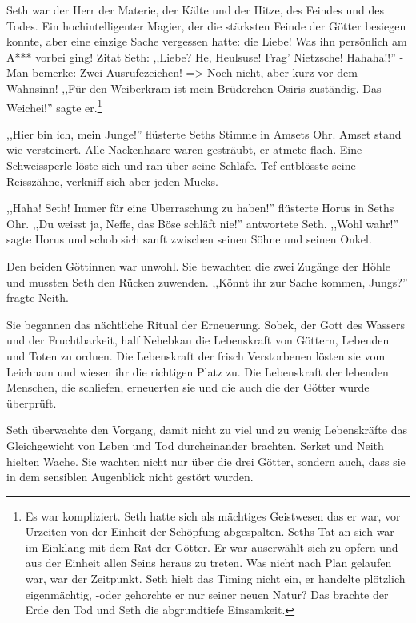 \documentclass[11pt,titlepage,a5paper]{book}
\begin{document}
Seth war der Herr der Materie, der Kälte und der Hitze, des Feindes und des Todes. Ein hochintelligenter Magier, der die stärksten Feinde der Götter besiegen konnte, aber eine einzige Sache vergessen hatte: die Liebe! Was ihn persönlich am A*** vorbei ging! Zitat Seth: ,,Liebe? He, Heulsuse! Frag' Nietzsche! Hahaha!!'' -Man bemerke: Zwei Ausrufezeichen! => Noch nicht, aber kurz vor dem Wahnsinn! ,,Für den Weiberkram ist mein Brüderchen Osiris zuständig. Das Weichei!'' sagte er.\footnote{Es war kompliziert. Seth hatte sich als mächtiges Geistwesen das er war, vor Urzeiten von der Einheit der Schöpfung abgespalten. Seths Tat an sich war im Einklang mit dem Rat der Götter. Er war auserwählt sich zu opfern und aus der Einheit allen Seins heraus zu treten. Was nicht nach Plan gelaufen war, war der Zeitpunkt. Seth hielt das Timing nicht ein, er handelte plötzlich eigenmächtig, -oder gehorchte er nur seiner neuen Natur? Das brachte der Erde den Tod und Seth die abgrundtiefe Einsamkeit.} 

,,Hier bin ich, mein Junge!'' flüsterte Seths Stimme in Amsets Ohr. Amset stand wie versteinert. Alle Nackenhaare waren gesträubt, er atmete flach. Eine Schweissperle löste sich und ran über seine Schläfe. Tef entblösste seine Reisszähne, verkniff sich aber jeden Mucks.

,,Haha! Seth! Immer für eine Überraschung zu haben!'' flüsterte Horus in Seths Ohr. ,,Du weisst ja, Neffe, das Böse schläft nie!'' antwortete Seth. ,,Wohl wahr!'' sagte Horus und schob sich sanft zwischen seinen Söhne und seinen Onkel. 

Den beiden Göttinnen war unwohl. Sie bewachten die zwei Zugänge der Höhle und mussten Seth den Rücken zuwenden. ,,Könnt ihr zur Sache kommen, Jungs?'' fragte Neith. 

Sie begannen das nächtliche Ritual der Erneuerung. Sobek, der Gott des Wassers und der Fruchtbarkeit, half Nehebkau die Lebenskraft von Göttern, Lebenden und Toten zu ordnen. Die Lebenskraft der frisch Verstorbenen lösten sie vom Leichnam und wiesen ihr die richtigen Platz zu. Die Lebenskraft der lebenden Menschen, die schliefen, erneuerten sie und die auch die der Götter wurde überprüft.

Seth überwachte den Vorgang, damit nicht zu viel und zu wenig Lebenskräfte das Gleichgewicht von Leben und Tod durcheinander brachten. Serket und Neith hielten Wache. Sie wachten nicht nur über die drei Götter, sondern auch, dass sie in dem sensiblen Augenblick nicht gestört wurden. 
\end{document}

